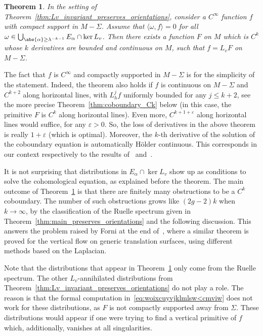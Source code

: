 \documentclass[JEP,XML,SOM,Unicode]{cedram}
\let\epsilon\varepsilon
\newtheorem{thm}{Theorem}[section]
\theoremstyle{definition}
\numberwithin{equation}{section}
\begin{document}
\begin{thm}
\label{thm:coboundary_Ck_main} In the setting of
Theorem~\ref{thm:Lv_invariant_preserves_orientations}, consider a $C^\infty$
function $f$ with compact support in $M-\Sigma$. Assume that $\langle \omega,
f\rangle = 0$ for all $\omega \in \bigcup_{\abs{\alpha} \geq \lambda^{-k-1}}
E_\alpha \cap \ker L_v$. Then there exists a function $F$ on $M$ which is
$C^k$ whose $k$ derivatives are bounded and continuous on $M$, such that $f =
L_v F$ on $M-\Sigma$.
\end{thm}
The fact that $f$ is $C^\infty$ and compactly supported in $M-\Sigma$ is for
the simplicity of the statement. Indeed, the theorem also holds if $f$ is
continuous on $M-\Sigma$ and $C^{k+2}$ along horizontal lines, with $L_h^j f$
uniformly bounded for any $j \leq k+2$, see the more precise
Theorem~\ref{thm:coboundary_Ck} below (in this case, the primitive $F$ is
$C^k$ along horizontal lines). Even more, $C^{k+1+\epsilon}$ along horizontal
lines would suffice, for any $\epsilon>0$. So, the loss of derivatives in the
above theorem is really $1+\epsilon$ (which is optimal). Moreover, the $k$-th
derivative of the solution of the coboundary equation is automatically Hölder
continuous. This corresponds in our context respectively to the results
of~\cite{forni_regularity} and~\cite{marmi_yoccoz_Holder}.

It is not surprising that distributions in $E_\alpha \cap \ker L_v$ show up
as conditions to solve the cohomological equation, as explained before the
theorem. The main outcome of Theorem~\ref{thm:coboundary_Ck_main} is that
there are finitely many obstructions to be a $C^k$ coboundary. The number of
such obstructions grows like $(2g-2)k$ when $k\to \infty$, by the
classification of the Ruelle spectrum given in
Theorem~\ref{thm:main_preserves_orientations} and the following discussion.
This answers the problem raised by Forni at the end
of~\cite{forni_cohomological}, where a similar theorem is proved for the
vertical flow on generic translation surfaces, using different methods based
on the Laplacian.

Note that the distributions that appear in
Theorem~\ref{thm:coboundary_Ck_main} only come from the Ruelle spectrum. The
other $L_v$-annihilated distributions from
Theorem~\ref{thm:Lv_invariant_preserves_orientations} do not play a role. The
reason is that the formal computation in~\eqref{eq:woixcuyvjklmlsw<cmviw}
does not work for these distributions, as $F$ is not compactly supported away
from $\Sigma$. These distributions would appear if one were trying to find a
vertical primitive of $f$ which, additionally, vanishes at all singularities.
\end{document}
